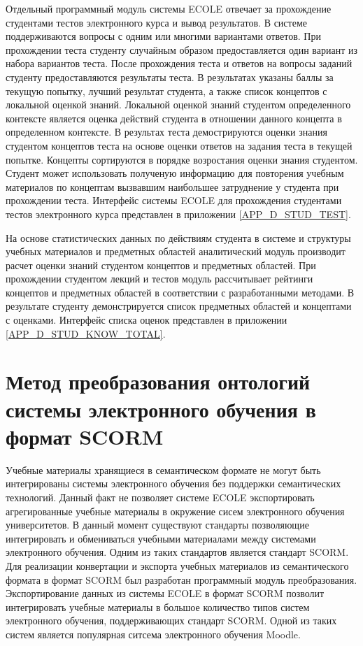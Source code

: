 Отдельный программный модуль системы ECOLE отвечает за прохождение студентами тестов электронного курса и вывод результатов. В системе поддерживаются вопросы с одним или многими вариантами ответов. При прохождении теста студенту случайным образом предоставляется один вариант из набора вариантов теста. После прохождения теста и ответов на вопросы заданий студенту предоставляются результаты теста. В результатах указаны баллы за текущую попытку, лучший результат студента, а также список концептов с локальной оценкой знаний. Локальной оценкой знаний студентом определенного контексте является оценка действий студента в отношении данного концепта в определенном контексте. В результах теста демострируются оценки знания студентом концептов теста на основе оценки ответов на задания теста в текущей попытке. Концепты сортируются в порядке возростания оценки знания студентом. Студент может использовать полученую информацию для повторения учебным материалов по концептам вызвавшим наибольшее затруднение у студента при прохождении теста. Интерфейс системы ECOLE для прохождения студентами тестов электронного курса представлен в приложении \ref{APP_D_STUD_TEST}.

На основе статистических данных по действиям студента в системе и структуры учебных материалов и предметных областей аналитический модуль производит расчет оценки знаний студентом концептов и предметных областей. При прохождении студентом лекций и тестов модуль рассчитывает рейтинги концептов и предметных областей в соответствии с разработанными методами. В результате студенту демонстрируется список предметных областей и концептами с оценками. Интерфейс списка оценок представлен в приложении \ref{APP_D_STUD_KNOW_TOTAL}.


\section{Метод преобразования онтологий системы электронного обучения в формат SCORM} \label{sect4_3}

Учебные материалы хранящиеся в семантическом формате не могут быть интегрированы системы электронного обучения без поддержки семантических технологий. Данный факт не позволяет системе ECOLE экспортировать агрегированные учебные материалы в окружение сисем электронного обучения университетов. В данный момент существуют стандарты позволяющие интегрировать и обмениваться учебными материалами между системами электронного обучения. Одним из таких стандартов является стандарт SCORM. Для реализации конвертации и экспорта учебных материалов из семантического формата в формат SCORM был разработан программный модуль преобразования. Экспортирование данных из системы ECOLE в формат SCORM позволит интегрировать учебные материалы в большое количество типов систем электронного обучения, поддерживающих стандарт SCORM. Одной из таких систем является популярная ситсема электронного обучения Moodle.

